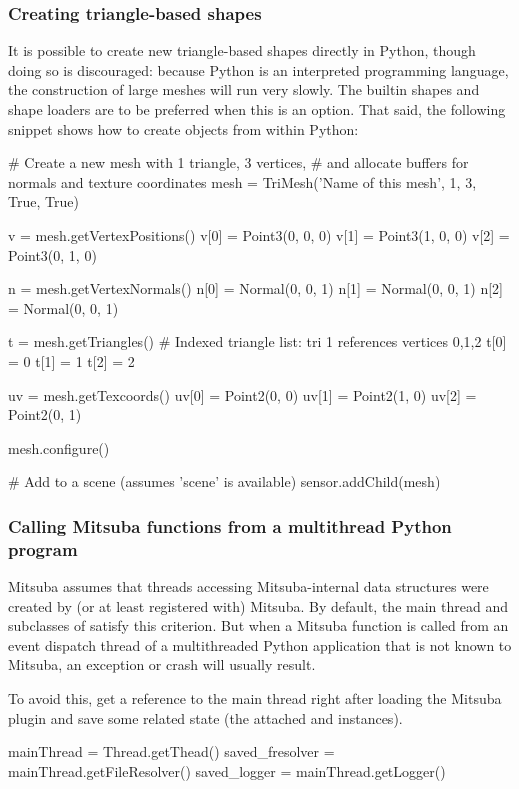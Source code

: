 \subsubsection{Creating triangle-based shapes}
It is possible to create new triangle-based shapes directly in Python, though
doing so is discouraged: because Python is an interpreted programming language,
the construction of large meshes will run very slowly. The builtin shapes
and shape loaders are to be preferred when this is an option. That said, the
following snippet shows how to create  objects from within Python:
\begin{python}
# Create a new mesh with 1 triangle, 3 vertices,
# and allocate buffers for normals and texture coordinates
mesh = TriMesh('Name of this mesh', 1, 3, True, True)

v = mesh.getVertexPositions()
v[0] = Point3(0, 0, 0)
v[1] = Point3(1, 0, 0)
v[2] = Point3(0, 1, 0)

n = mesh.getVertexNormals()
n[0] = Normal(0, 0, 1)
n[1] = Normal(0, 0, 1)
n[2] = Normal(0, 0, 1)

t = mesh.getTriangles() # Indexed triangle list: tri 1 references vertices 0,1,2
t[0] = 0
t[1] = 1
t[2] = 2

uv = mesh.getTexcoords()
uv[0] = Point2(0, 0)
uv[1] = Point2(1, 0)
uv[2] = Point2(0, 1)

mesh.configure()

# Add to a scene (assumes 'scene' is available)
sensor.addChild(mesh)
\end{python}


\subsubsection{Calling Mitsuba functions from a multithread Python program}
Mitsuba assumes that threads accessing Mitsuba-internal
data structures were created by (or at least registered with) Mitsuba. By default,
the main thread and subclasses of  satisfy this criterion. But when a
Mitsuba function is called from an event dispatch thread of a multithreaded
Python application that is not known to Mitsuba, an exception or crash will usually result.

To avoid this, get a reference to the main thread right after loading the Mitsuba plugin
and save some related state (the attached  and  instances).
\begin{python}
mainThread = Thread.getThead()
saved_fresolver = mainThread.getFileResolver()
saved_logger = mainThread.getLogger()
\end{python}

